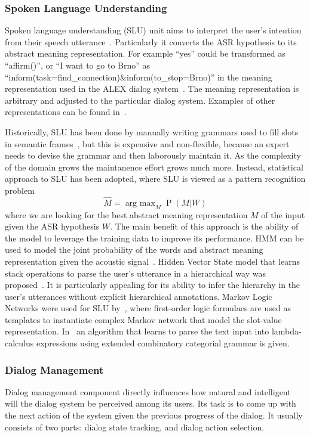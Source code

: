 \documentclass[11pt,twocolumn]{article}
\begin{document}
\subsubsection{Spoken Language Understanding}
Spoken language understanding (SLU) unit aims to interpret the user's intention from their speech utterance~\cite{wang2005spoken}. Particularly it converts the ASR hypothesis to its abstract meaning representation. For example ``yes'' could be transformed as ``affirm()'', or ``I want to go to Brno'' as ``inform(task=find\_connection)\&inform(to\_stop=Brno)'' in the meaning representation used in the ALEX dialog system~\cite{duvsek2014alex}. The meaning representation is arbitrary and adjusted to the particular dialog system. Examples of other representations can be found in~\cite{skantze2008galatea,he2003data}.

Historically, SLU has been done by manually writing grammars used to fill slots in semantic frames~\cite{ward1994recent,dowding1993gemini}, but this is expensive and non-flexible, because an expert needs to devise the grammar and then laborously maintain it. As the complexity of the domain grows the maintanence effort grows much more. Instead, statistical approach to SLU has been adopted, where SLU is viewed as a pattern recognition problem
$$\hat M=\operatorname{arg~max}_M \operatorname{P}(M|W)$$
where we are looking for the best abstract meaning representation $M$ of the input given the ASR hypothesis $W$. The main benefit of this approach is the ability of the model to leverage the training data to improve its performance. HMM can be used to model the joint probability of the words and abstract meaning representation given the acoustic signal~\cite{pieraccini1992progress,pieraccini1992stochastic}. Hidden Vector State model that learns stack operations to parse the user's utterance in a hierarchical way was proposed~\cite{he2003data}. It is particularly appealing for its ability to infer the hierarchy in the user's utterances without explicit hierarchical annotations. Markov Logic Networks were used for SLU by~\cite{meza2008spoken}, where first-order logic formulaes are used as templates to instantiate complex Markov network that model the slot-value representation. In~\cite{zettlemoyer2007online} an algorithm that learns to parse the text input into lambda-calculus expressions using extended combinatory categorial grammar is given.

\subsubsection{Dialog Management}
Dialog management component directly influences how natural and intelligent will the dialog system be perceived among its users. Its task is to come up with the next action of the system given the previous progress of the dialog. It usually consists of two parts: dialog state tracking, and dialog action selection.
\end{document}
